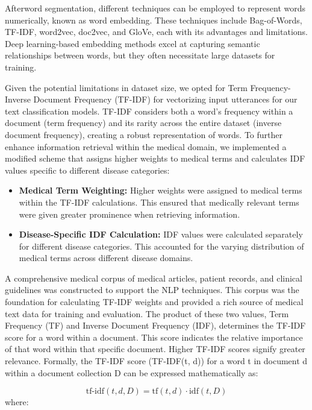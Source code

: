 \documentclass[conference]{IEEEtran}
\begin{document}
    Afterword segmentation, different techniques can be employed to represent words numerically, known as word embedding. These techniques include Bag-of-Words, TF-IDF, word2vec, doc2vec, and GloVe, each with its advantages and limitations. Deep learning-based embedding methods excel at capturing semantic relationships between words, but they often necessitate large datasets for training.

    Given the potential limitations in dataset size, we opted for Term Frequency-Inverse Document Frequency (TF-IDF) for vectorizing input utterances for our text classification models. TF-IDF considers both a word's frequency within a document (term frequency) and its rarity across the entire dataset (inverse document frequency), creating a robust representation of words. To further enhance information retrieval within the medical domain, we implemented a modified scheme that assigns higher weights to medical terms and calculates IDF values specific to different disease categories:
    \begin{itemize}
        \item \textbf{Medical Term Weighting:} Higher weights were assigned to medical terms within the TF-IDF calculations. This ensured that medically relevant terms were given greater prominence when retrieving information.
        \item \textbf{Disease-Specific IDF Calculation:} IDF values were calculated separately for different disease categories. This accounted for the varying distribution of medical terms across different disease domains.
    \end{itemize}

    A comprehensive medical corpus of medical articles, patient records, and clinical guidelines was constructed to support the NLP techniques. This corpus was the foundation for calculating TF-IDF weights and provided a rich source of medical text data for training and evaluation. The product of these two values, Term Frequency (TF) and Inverse Document Frequency (IDF), determines the TF-IDF score for a word within a document. This score indicates the relative importance of that word within that specific document. Higher TF-IDF scores signify greater relevance. Formally, the TF-IDF score (TF-IDF(t, d)) for a word t in document d within a document collection D can be expressed mathematically as:

    \begin{equation}
    \text{tf-idf}(t, d, D) = \text{tf}(t, d) \cdot \text{idf}(t, D)
    \end{equation}
    where: \\
    
\end{document}
